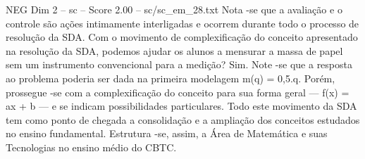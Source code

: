 \begin{textsample}{NEG Dim 2 – sc – Score 2.00 – sc/sc\_em\_28.txt}
Nota -se que a avaliação e o controle são ações intimamente interligadas e ocorrem durante todo o processo de resolução da SDA.
Com o movimento de complexificação do conceito apresentado na resolução da SDA, podemos ajudar os alunos a mensurar a massa de papel sem um instrumento convencional para a medição?
Sim.
Note -se que a resposta ao problema poderia ser dada na primeira modelagem m(q) = 0,5.q.
Porém, prossegue -se com a complexificação do conceito para sua forma geral — f(x) = ax + b — e se indicam possibilidades particulares.
Todo este movimento da SDA tem como ponto de chegada a consolidação e a ampliação dos conceitos estudados no ensino fundamental.
Estrutura -se, assim, a Área de Matemática e suas Tecnologias no ensino médio do CBTC.

\end{textsample}
